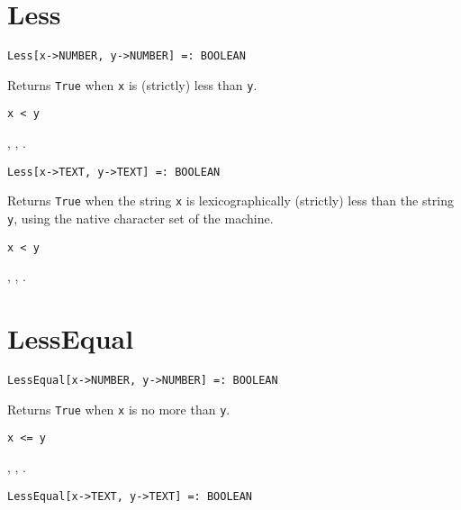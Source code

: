 
\section*{Less}\label{PrimLess}
\begin{verbatim}
Less[x->NUMBER, y->NUMBER] =: BOOLEAN 
\end{verbatim}

\noindent
Returns \verb+True+ when \verb+x+ is (strictly) less than \verb+y+.

\shortform \verb+x < y+

\seealso {},
,
.

\newsignature

\begin{verbatim}
Less[x->TEXT, y->TEXT] =: BOOLEAN 
\end{verbatim}

\noindent
Returns \verb+True+ when the string \verb+x+ is lexicographically
(strictly) less than the string \verb+y+, using the native character
set of the machine.

\shortform \verb+x < y+

\seealso {},
,
.


\section*{LessEqual}\label{PrimLessEqual}
\begin{verbatim}
LessEqual[x->NUMBER, y->NUMBER] =: BOOLEAN 
\end{verbatim}

\noindent
Returns \verb+True+ when \verb+x+ is no more than \verb+y+.

\shortform \verb+x <= y+

\seealso {},
,
.

\newsignature

\begin{verbatim}
LessEqual[x->TEXT, y->TEXT] =: BOOLEAN 
\end{verbatim}

